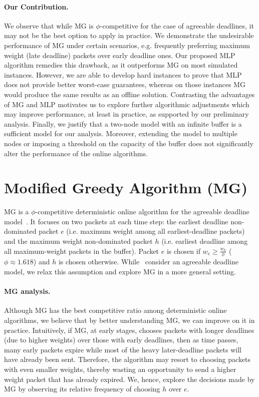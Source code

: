 \documentclass[oribibl]{llncs}
\begin{document}
\paragraph{Our Contribution.} We observe that while MG is $\phi$-competitive for the case of agreeable deadlines, it may not be the best option
to apply in practice. We demonstrate  the undesirable
performance of MG under certain scenarios, e.g. frequently preferring
maximum weight (late deadline) packets over early deadline ones. Our
proposed MLP algorithm remedies this drawback, as it outperforms MG on
most simulated instances. However, we are able to develop hard
instances to prove that MLP does not provide better worst-case
guarantees, whereas on those instances MG would produce the same
results as an offline solution. Contrasting the advantages of MG and
MLP motivates us to explore further algorithmic adjustments which may
improve performance, at least in practice, as supported by our
preliminary analysis. Finally, we justify that a two-node model with
an infinite buffer is a sufficient model for our
analysis. Moreover, extending the model to multiple nodes or imposing a
threshold on the capacity of the buffer does not significantly alter the performance
of the online algorithms.  

\section{Modified Greedy Algorithm (MG)}
\label{sec:MG}


MG is a $\phi$-competitive deterministic online algorithm for the
agreeable deadline model~\cite{jez12}. It focuses on two packets at
each time step: the earliest deadline non-dominated packet $e$
(i.e. maximum weight among all earliest-deadline packets) and the
maximum weight non-dominated packet $h$ (i.e. earliest deadline among
all maximum-weight packets in the buffer). Packet $e$ is chosen if
$w_e \geq \frac{w_h}{\phi}$ ($\phi\approx 1.618$) and $h$ is chosen
otherwise. While~\cite{jez12} consider an agreeable deadline model,
we relax this assumption and explore MG in a more general setting.

\paragraph{ MG analysis.} Although MG has the best competitive ratio
among deterministic online algorithms, we believe
that by better understanding MG, we can improve on it in
practice. Intuitively, if MG, at early stages, chooses packets with
longer deadlines (due to higher weights) over those with early
deadlines, then as time passes, many early packets expire while
most of the heavy later-deadline  packets will have already been
sent. Therefore, the algorithm may resort to choosing packets
with even smaller weights, thereby
wasting an opportunity to send a higher weight packet that has
already expired.  We, hence, explore the decisions made by MG by observing
its relative frequency of choosing $h$ over $e$.  
\end{document}
